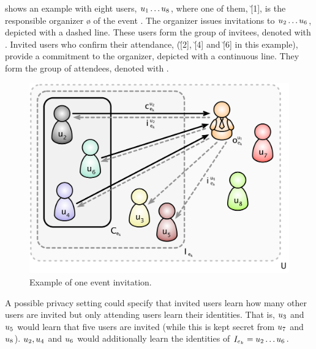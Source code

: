  shows an example with eight users, $\u[1] \dots \u[8]$, where one 
of them, \u[1], is the responsible organizer \o{} of the event \e{}. 
The organizer issues invitations to $\u[2] \dots \u[6]$, depicted with 
a dashed line. These users form the group of invitees, denoted with \I.
Invited users who confirm their attendance, (\u[2], \u[4] and \u[6] in
this example), provide a commitment to the organizer, depicted with a
continuous line. They form the group of attendees, denoted with \C.

\begin{figure}
  \centering
  \includegraphics[width=.73\linewidth]{images/event-invitations-dosns/system-overview}
  \caption{Example of one event invitation.}
  \label{figure:event-invitations-dosns:system-overview}
\end{figure}

A possible privacy setting
could specify that invited users learn how many other users are invited
but only attending users learn their identities. That is, $\u[3]$
and $\u[5]$ would learn that five users are invited (while this is kept
secret from $\u[7]$ and $\u[8]$). $\u[2], \u[4]$ and $\u[6]$
would additionally learn the identities of $\I = \u[2] \dots \u[6]$.

